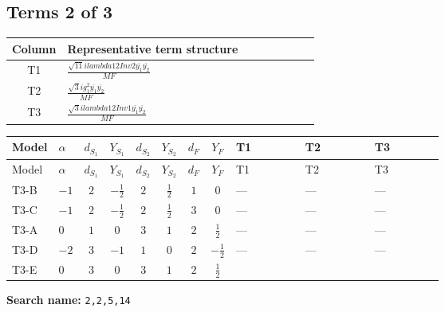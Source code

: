 \documentclass[8pt]{article}
\begin{document}
\begin{landscape}
\subsection*{Terms 2 of 3}
\begin{center}
\begin{tabular}{@{}c >{\raggedright\arraybackslash}p{0.82\linewidth}@{}}
\toprule
Column & Representative term structure \\
\midrule
T1 & \(\displaystyle \frac{\sqrt{11} i lambda12Inv2 \overline{y_{1}} \overline{y_{2}}}{MF}\) \\
\midrule
T2 & \(\displaystyle \frac{\sqrt{3} i g_{1}^{2} \overline{y_{1}} \overline{y_{2}}}{MF}\) \\
\midrule
T3 & \(\displaystyle \frac{\sqrt{3} i lambda12Inv1 \overline{y_{1}} \overline{y_{2}}}{MF}\) \\
\midrule
\bottomrule
\end{tabular}
\end{center}
\smallskip
\tiny
\begin{longtable}{@{}llcccccc >{\raggedright\arraybackslash}p{0.21\linewidth} >{\raggedright\arraybackslash}p{0.21\linewidth} >{\raggedright\arraybackslash}p{0.21\linewidth}@{}}
\toprule
Model & $\alpha$ & $d_{S_1}$ & $Y_{S_1}$ & $d_{S_2}$ & $Y_{S_2}$ & $d_F$ & $Y_F$ & T1 & T2 & T3 \\
\midrule
\endfirsthead
\toprule
Model & $\alpha$ & $d_{S_1}$ & $Y_{S_1}$ & $d_{S_2}$ & $Y_{S_2}$ & $d_F$ & $Y_F$ & T1 & T2 & T3 \\
\midrule
\endhead
T3-B & $-1$ & $2$ & $-\frac{1}{2}$ & $2$ & $\frac{1}{2}$ & $1$ & $0$ & --- & --- & --- \\
\midrule
T3-C & $-1$ & $2$ & $-\frac{1}{2}$ & $2$ & $\frac{1}{2}$ & $3$ & $0$ & --- & --- & --- \\
\midrule
T3-A & $0$ & $1$ & $0$ & $3$ & $1$ & $2$ & $\frac{1}{2}$ & --- & --- & --- \\
\midrule
T3-D & $-2$ & $3$ & $-1$ & $1$ & $0$ & $2$ & $-\frac{1}{2}$ & --- & --- & --- \\
\midrule
T3-E & $0$ & $3$ & $0$ & $3$ & $1$ & $2$ & $\frac{1}{2}$ & \scriptsize\adjustbox{max width=\linewidth}{$\begin{gathered} - \frac{3 \sqrt{11} i lambda12Inv2 \overline{y_{1}} \overline{y_{2}}}{22 MF}\end{gathered}$} & \scriptsize\adjustbox{max width=\linewidth}{$\begin{gathered} - \frac{\sqrt{3} i g_{1}^{2} \overline{y_{1}} \overline{y_{2}}}{8 MF}\end{gathered}$} & \scriptsize\adjustbox{max width=\linewidth}{$\begin{gathered} \frac{\sqrt{3} i lambda12Inv1 \overline{y_{1}} \overline{y_{2}}}{6 MF}\end{gathered}$} \\
\midrule
\bottomrule
\end{longtable}
\clearpage
\noindent\textbf{Search name: }\texttt{2,2,5,14}\par\smallskip

\end{landscape}
\end{document}
